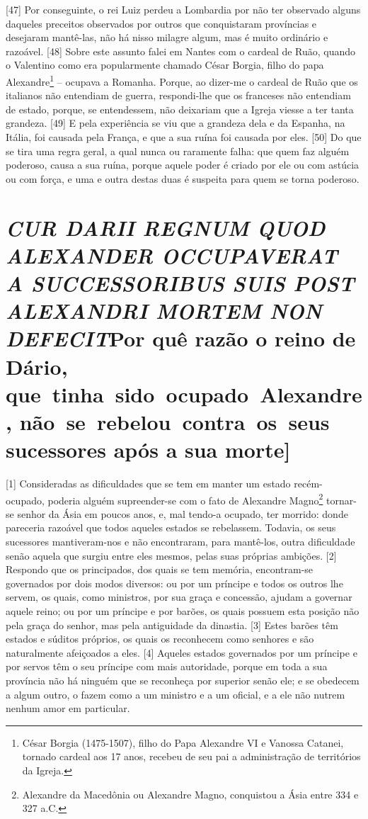 {[}47{]} Por conseguinte, o rei Luiz perdeu a Lombardia por não ter
observado alguns daqueles preceitos observados por outros que
conquistaram províncias e desejaram mantê-las, não há nisso milagre
algum, mas é muito ordinário e razoável. {[}48{]} Sobre este assunto
falei em Nantes com o cardeal de Ruão, quando o Valentino como era
popularmente chamado César Borgia, filho do papa Alexandre\footnote{César
  Borgia (1475-1507), filho do Papa Alexandre VI e Vanossa Catanei,
  tornado cardeal aos 17 anos, recebeu de seu pai a administração de
  territórios da Igreja.} -- ocupava a Romanha. Porque, ao dizer-me o
cardeal de Ruão que os italianos não entendiam de guerra, respondi-lhe
que os franceses não entendiam de estado, porque, se entendessem, não
deixariam que a Igreja viesse a ter tanta grandeza. {[}49{]} E pela
experiência se viu que a grandeza dela e da Espanha, na Itália, foi
causada pela França, e que a sua ruína foi causada por eles. {[}50{]} Do
que se tira uma regra geral, a qual nunca ou raramente falha: que quem
faz alguém poderoso, causa a sua ruína, porque aquele poder é criado por
ele ou com astúcia ou com força, e uma e outra destas duas é suspeita
para quem se torna poderoso.

\quebra\section{\emph{CUR DARII REGNUM QUOD ALEXANDER OCCUPAVERAT A SUCCESSORIBUS SUIS
POST ALEXANDRI MORTEM NON DEFECIT}\break {[}Por quê razão o reino de Dário, que~tinha~sido~ocupado~Alexandre, não~se~rebelou~contra~os~seus sucessores após a sua morte{]}}

{[}1{]} Consideradas as dificuldades que se tem em manter um estado
recém- ocupado, poderia alguém supreender-se com o fato de Alexandre
Magno\footnote{Alexandre da Macedônia ou Alexandre Magno, conquistou a
  Ásia entre 334 e 327 a.C.} tornar-se senhor da Ásia em poucos anos, e,
mal tendo-a ocupado, ter morrido: donde pareceria razoável que todos
aqueles estados se rebelassem. Todavia, os seus sucessores
mantiveram-nos e não encontraram, para mantê-los, outra dificuldade
senão aquela que surgiu entre eles mesmos, pelas suas próprias ambições.
{[}2{]} Respondo que os principados, dos quais se tem memória,
encontram-se governados por dois modos diversos: ou por um príncipe e
todos os outros lhe servem, os quais, como ministros, por sua graça e
concessão, ajudam a governar aquele reino; ou por um príncipe e por
barões, os quais possuem esta posição não pela graça do senhor, mas pela
antiguidade da dinastia. {[}3{]} Estes barões têm estados e súditos
próprios, os quais os reconhecem como senhores e são naturalmente
afeiçoados a eles. {[}4{]} Aqueles estados governados por um príncipe e
por servos têm o seu príncipe com mais autoridade, porque em toda a sua
província não há ninguém que se reconheça por superior senão ele; e se
obedecem a algum outro, o fazem como a um ministro e a um oficial, e a
ele não nutrem nenhum amor em particular.

